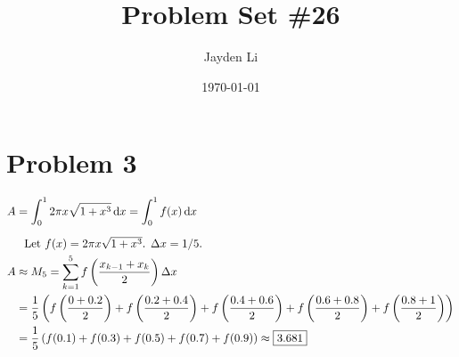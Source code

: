 \documentclass[letterpaper]{article}
\title{\vspace*{-30pt}Problem Set \#26}
\author{Jayden Li}
\date{\today}
\newcommand{\alignedintertext}[1]{%
  \noalign{%
    \vskip\belowdisplayshortskip
    \vtop{\hsize=\linewidth#1\par
    \expandafter}%
    \expandafter\prevdepth\the\prevdepth
  }%
}
\newcommand*{\problem}[1]{\section*{Problem #1}}
\begin{document}
\fontsize{12pt}{12pt}\selectfont
\setlength{\abovedisplayskip}{0pt}
\maketitle
\problem{3}
$\begin{aligned}[t]
    A&=\int_{0}^{1}2\pi x \sqrt{1+x^3}\,\mathrm{d}x=\int_{0}^{1}f(x)\,\mathrm{d}x \\
	\alignedintertext{Let $f(x)=2\pi x \sqrt{1+x^3}$. $\Delta x=1/5$.}
	A&\approx M_5
	=\sum_{k=1}^{5}f \left(\frac{x_{k-1}+x_k}{2}\right)\Delta x \\
	&=\frac15 \left(f \left(\frac{0+0.2}{2}\right)+f \left(\frac{0.2+0.4}{2}\right)+f \left(\frac{0.4+0.6}{2}\right)+f \left(\frac{0.6+0.8}{2}\right)+f \left(\frac{0.8+1}{2}\right)\right) \\
	&=\frac15 \left(f(0.1)+f(0.3)+f(0.5)+f(0.7)+f(0.9)\right)
	\approx \boxed{3.681}
\end{aligned}$
\end{document}
